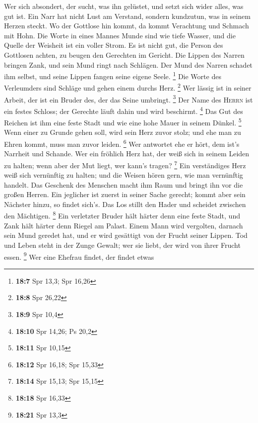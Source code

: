  Wer sich absondert, der sucht, was ihn gelüstet, und
setzt sich wider alles, was gut ist.  Ein Narr hat nicht
Lust am Verstand, sondern kundzutun, was in seinem Herzen steckt.
 Wo der Gottlose hin kommt, da kommt Verachtung und
Schmach mit Hohn.  Die Worte in eines Mannes Munde sind
wie tiefe Wasser, und die Quelle der Weisheit ist ein voller Strom.
 Es ist nicht gut, die Person des Gottlosen achten, zu
beugen den Gerechten im Gericht.  Die Lippen des Narren
bringen Zank, und sein Mund ringt nach Schlägen.  Der Mund
des Narren schadet ihm selbst, und seine Lippen fangen seine eigene
Seele. \footnote{\textbf{18:7} Spr 13,3; Spr 16,26}  Die
Worte des Verleumders sind Schläge und gehen einem durchs Herz.
\footnote{\textbf{18:8} Spr 26,22}  Wer lässig ist in
seiner Arbeit, der ist ein Bruder des, der das Seine umbringt.
\footnote{\textbf{18:9} Spr 10,4}  Der Name des
\textsc{Herrn} ist ein festes Schloss; der Gerechte läuft dahin und wird
beschirmt. \footnote{\textbf{18:10} Spr 14,26; Ps 20,2} 
Das Gut des Reichen ist ihm eine feste Stadt und wie eine hohe Mauer in
seinem Dünkel. \footnote{\textbf{18:11} Spr 10,15}  Wenn
einer zu Grunde gehen soll, wird sein Herz zuvor stolz; und ehe man zu
Ehren kommt, muss man zuvor leiden. \footnote{\textbf{18:12} Spr 16,18;
  Spr 15,33}  Wer antwortet ehe er hört, dem ist's
Narrheit und Schande.  Wer ein fröhlich Herz hat, der
weiß sich in seinem Leiden zu halten; wenn aber der Mut liegt, wer
kann's tragen? \footnote{\textbf{18:14} Spr 15,13; Spr 15,15}
 Ein verständiges Herz weiß sich vernünftig zu halten;
und die Weisen hören gern, wie man vernünftig handelt. 
Das Geschenk des Menschen macht ihm Raum und bringt ihn vor die großen
Herren.  Ein jeglicher ist zuerst in seiner Sache
gerecht; kommt aber sein Nächster hinzu, so findet sich's.
 Das Los stillt den Hader und scheidet zwischen den
Mächtigen. \footnote{\textbf{18:18} Spr 16,33}  Ein
verletzter Bruder hält härter denn eine feste Stadt, und Zank hält
härter denn Riegel am Palast.  Einem Mann wird vergolten,
darnach sein Mund geredet hat, und er wird gesättigt von der Frucht
seiner Lippen.  Tod und Leben steht in der Zunge Gewalt;
wer sie liebt, der wird von ihrer Frucht essen. \footnote{\textbf{18:21}
  Spr 13,3}  Wer eine Ehefrau findet, der findet etwas
